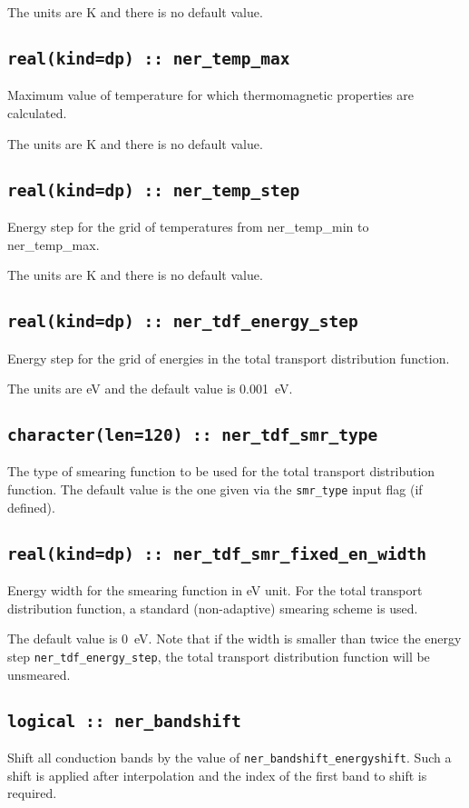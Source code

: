 The units are K and there is no default value.

\subsection[ner\_temp\_max]{\tt real(kind=dp) :: ner\_temp\_max}
Maximum value of temperature for which thermomagnetic properties are calculated.

The units are K and there is no default value.

\subsection[ner\_temp\_step]{\tt real(kind=dp) :: ner\_temp\_step}
Energy step for the grid of temperatures from ner\_temp\_min to ner\_temp\_max.

The units are K and there is no default value.

\subsection[ner\_tdf\_energy\_step]{\tt real(kind=dp) :: ner\_tdf\_energy\_step}
Energy step for the grid of energies in the total transport distribution function.

The units are eV and the default value is 0.001~eV.

\subsection[ner\_tdf\_smr\_type]{\tt character(len=120) :: ner\_tdf\_smr\_type}
The type of smearing function to be used for the total transport distribution function. The default value is the one given via the {\tt smr\_type} input flag (if defined).

\subsection[ner\_tdf\_smr\_fixed\_en\_width]{\tt real(kind=dp) :: ner\_tdf\_smr\_fixed\_en\_width}
Energy width for the smearing function in eV unit. For the total transport distribution function, a standard (non-adaptive) smearing scheme is used.

The default value is 0~eV. Note that if the width is smaller than twice the energy step {\tt ner\_tdf\_energy\_step}, the total transport distribution function will be unsmeared.


\subsection[ner\_bandshift]{\tt logical :: ner\_bandshift}
Shift all conduction bands by the value of  {\tt ner\_bandshift\_energyshift}. Such a shift is applied after interpolation and the index of the first band to shift is required. 


